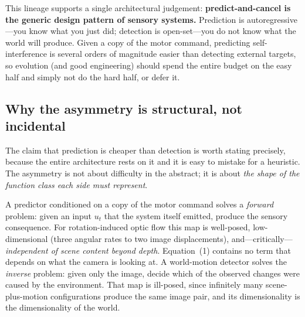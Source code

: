\documentclass[12pt,a4paper]{article}
\begin{document}
This lineage supports a single architectural judgement: \textbf{predict-and-cancel is the generic design pattern of sensory systems.} Prediction is autoregressive---you know what you just did; detection is open-set---you do not know what the world will produce. Given a copy of the motor command, predicting self-interference is several orders of magnitude easier than detecting external targets, so evolution (and good engineering) should spend the entire budget on the easy half and simply not do the hard half, or defer it.

\subsection{Why the asymmetry is structural, not incidental}

The claim that prediction is cheaper than detection is worth stating precisely, because the entire architecture rests on it and it is easy to mistake for a heuristic. The asymmetry is not about difficulty in the abstract; it is about \emph{the shape of the function class each side must represent}.

A predictor conditioned on a copy of the motor command solves a \emph{forward} problem: given an input $u_t$ that the system itself emitted, produce the sensory consequence. For rotation-induced optic flow this map is well-posed, low-dimensional (three angular rates to two image displacements), and---critically---\emph{independent of scene content beyond depth}. Equation~(1) contains no term that depends on what the camera is looking at. A world-motion detector solves the \emph{inverse} problem: given only the image, decide which of the observed changes were caused by the environment. That map is ill-posed, since infinitely many scene-plus-motion configurations produce the same image pair, and its dimensionality is the dimensionality of the world.
\end{document}

